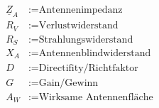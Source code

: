 \begin{center}
\end{center}\vspace{-1ex}
\small
\begin{align*}
    \underline{Z}_A & := \text{Antennenimpedanz}        \\
    R_V             & := \text{Verlustwiderstand}       \\
    R_S             & := \text{Strahlungswiderstand}    \\
    X_A             & := \text{Antennenblindwiderstand} \\
    D               & := \text{Directifity/Richtfaktor} \\
    G               & := \text{Gain/Gewinn}             \\
    A_W             & := \text{Wirksame Antennenfläche} \\
\end{align*}
\normalsize
